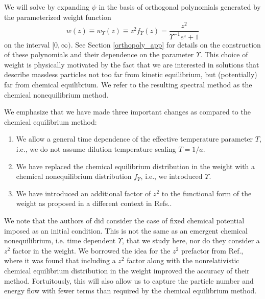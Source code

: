 We will solve  by expanding $\psi$ in the basis of orthogonal polynomials generated by the parameterized weight function
\begin{equation}\label{weight}
w(z)\equiv w_\Upsilon(z)\equiv z^2f_\Upsilon (z)=\frac{z^2}{\Upsilon^{-1} e^z+1}
\end{equation}
on the interval $[0,\infty)$. See Section \ref{orthopoly_app} for details on the construction of these polynomials and their dependence on the parameter $\Upsilon$. This choice of weight is physically motivated by the fact that we are interested in solutions that describe massless particles not too far from kinetic equilibrium, but (potentially) far from chemical equilibrium. We refer to the resulting spectral method as the chemical nonequilibrium method.

We emphasize that we have made three important changes as compared to  the chemical equilibrium method:
\begin{enumerate}
\item  We allow a general time dependence of the effective temperature parameter $T$, i.e., we do not assume dilution temperature scaling $T=1/a$.
\item We have replaced the chemical  equilibrium distribution in the weight   with a chemical nonequilibrium distribution  $f_\Upsilon $, i.e., we introduced $\Upsilon$.
\item We have introduced an additional factor of $z^2$ to the functional form of the weight as proposed in a different context in Refs.\cite{Wilkening,Wilkening2}. 
\end{enumerate} 
We note that the authors of \cite{Esposito:2000hi} did consider the case of fixed chemical potential imposed as an initial condition. This is not the same as an emergent chemical nonequilibrium, i.e. time dependent $\Upsilon$, that we study here, nor do they consider a $z^2$ factor in the weight. We borrowed the idea for the $z^2$ prefactor from   Ref.\cite{Wilkening2}, where it was found that including a $z^2$ factor along with the nonrelativistic chemical equilibrium distribution in the weight improved the accuracy of their method. Fortuitously,  this will also allow us to capture the particle number and energy flow with fewer terms than required by the chemical equilibrium method. 

